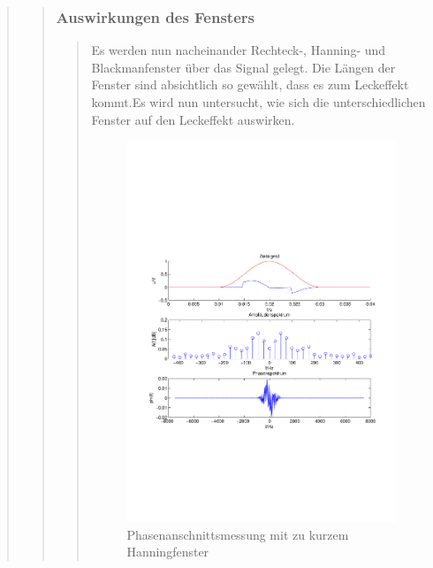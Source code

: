 \begin{quote}
\begin{quote}
\begin{quote}
		\end{quote}
		
		\subsubsection{Auswirkungen des Fensters}
		\begin{quote}
		
		Es werden nun nacheinander Rechteck-, Hanning- und Blackmanfenster über das
		Signal gelegt. Die Längen der Fenster sind absichtlich so gewählt, dass es zum
		Leckeffekt kommt.Es wird nun untersucht, wie sich die unterschiedlichen
		Fenster auf den Leckeffekt auswirken.
		
		\begin{figure}[H]
        \centering
            \includegraphics[scale=0.6, trim = 1.5cm 7cm 1.5cm 8.5cm,
            clip]{./Bilder/Phasenanschnittsmessungmithanningfensterleckeffekt}
                \caption{Phasenanschnittsmessung mit zu kurzem Hanningfenster}
        \end{figure}
    

\end{quote}
\end{quote}
\end{quote}
